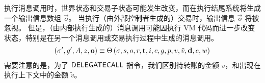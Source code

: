 执行消息调用时，世界状态和交易子状态可能发生改变，而在执行结尾系统将生成一个输出信息数组 $\vec{o}$。
当执行（由外部控制者生成的）交易时，输出信息 $\vec{o}$ 将被忽视。
但是，（由内部执行生成的）消息调用可能因执行 VM 代码而进一步改变状态，特别是在另一个消息调用或交易执行过程中生成的消息调用。
\begin{align}
  	\left(\mathbf{\sigma}', g', A, z, \mathbf{o} \right) \equiv \mathrm{\Theta}\left(\mathbf{\sigma},s,o,r,\mathbf{t},i,c,g, p,v,\tilde{v},\mathbf{d},e,w \right)
\end{align}  
需要注意的是，为了 $\mathsf{DELEGATECALL}$ 指令，我们区别待转账的金额 $v$，和出现在执行上下文中的金额  $\tilde{v}$。

